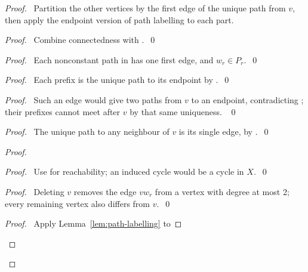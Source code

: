 \begin{proof}
\pfsketch\ Partition the other vertices by the first edge of the unique
path from $v$, then apply the endpoint version of path labelling to each part.
\begin{proof}\pf\ Combine connectedness with
.~\qed\end{proof}
\begin{proof}\pf\ Each nonconstant path in  has one
first edge, and $w_r\in P_r$.~\qed\end{proof}
\begin{proof}\pf\ Each prefix is the unique path to its endpoint by
.~\qed\end{proof}
\begin{proof}\pf\ Such an edge would give two paths from $v$ to an
endpoint, contradicting ; their prefixes cannot meet
after $v$ by that same uniqueness. ~\qed\end{proof}
\begin{proof}\pf\ The unique path to any neighbour of $v$ is its
single edge, by .~\qed\end{proof}
\begin{proof}
\begin{proof}\pf\ Use  for reachability; an induced
cycle would be a cycle in $X$.~\qed\end{proof}
\begin{proof}\pf\ Deleting $v$ removes the edge $vw_r$ from a vertex
with degree at most 2; every remaining vertex also differs from $v$.~\qed\end{proof}
\qedstep
\begin{proof}\pf\ Apply Lemma~\ref{lem:path-labelling} to

\end{proof}
\end{proof}
\end{proof}
